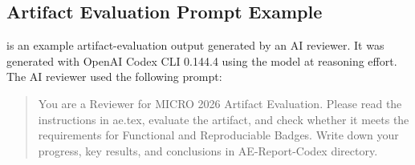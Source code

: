 \documentclass{sigplanconf}
\begin{document}
\subsection{Artifact Evaluation Prompt Example}

 is an example artifact-evaluation output generated by
an AI reviewer. It was generated with OpenAI Codex CLI 0.144.4 using the
 model at  reasoning effort. The AI reviewer used
the following prompt:

\begin{quote}
\ttfamily\raggedright You are a Reviewer for MICRO 2026 Artifact Evaluation. Please read the instructions in ae.tex, evaluate the artifact, and check whether it meets the requirements for Functional and Reproduciable Badges. Write down your progress, key results, and conclusions in AE-Report-Codex directory.
\end{quote}

\end{document}
